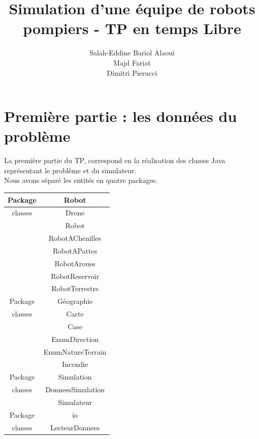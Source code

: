 \documentclass[
  oneside,
  11pt, a4paper,
  footinclude=true,
  headinclude=true,
  cleardoublepage=empty
]{scrbook}
\title{Simulation d’une équipe de robots pompiers - TP en temps Libre}
\author{Salah-Eddine Bariol Alaoui\\Majd Fariat\\Dimitri Pierucci}
\begin{document}
\maketitle

%
%
%
%
%


\chapter{Première partie : les données du problème}

La première partie du TP, correspond en la réalisation des classes Java représentant le problème et du simulateur. \\

Nous avons séparé les entités en quatre packages. \\

\begin{tabular}{|c|c|}
	\hline Package & Robot \\
	\hline \hline 
	classes & Drone \\
			& Robot \\
			& RobotAChenilles \\
			& RobotAPattes \\
			& RobotAroues \\
			& RobotReservoir \\
			& RobotTerrestre \\
	\hline \hline
	Package & Géographie \\
	\hline \hline
	classes & Carte \\
			& Case \\
			& EnumDirection \\
			& EnumNatureTerrain \\
			& Incendie \\
	\hline \hline
	Package & Simulation \\
	\hline \hline
	classes & DonneesSimulation \\
			& Simulateur \\
	\hline \hline
	Package & io \\
	\hline \hline
	classes & LecteurDonnees \\
	\hline
\end{tabular} \\
\end{document}
